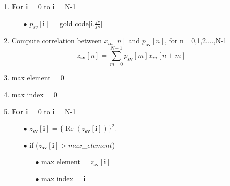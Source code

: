 \documentclass[journal,10pt,onecolumn]{article}
\begin{document}
\begin{enumerate}
\begin{enumerate}
        \item \textbf{For} \textbf{i} = 0 to \textbf{i} = N-1
        \begin{enumerate}
            \item[$\bullet$] $p_{sv}[\textbf{i}]$ = gold$\_$code[\textbf{i}.$\frac{fc}{fs}$]
        \end{enumerate}

        
        
        \item Compute correlation between $x_{in}[n]$ and $p_{\textbf{sv}}[n]$, for n= 0,1,2....,N-1
        \begin{equation}
            z{_{\textbf{sv}}}[n] = \sum_{m = 0}^{N-1}p_{\textbf{sv}}[m]x_{in}[n+m]
        \end{equation} 
        \item max$\_$element =   0
        \item max$\_$index   =   0
        \item \textbf{For} \textbf{i} = 0 to \textbf{i} = N-1
        \begin{enumerate}
            \item [$\bullet$]   $z{_{\textbf{sv}}}[\textbf{i}]$ = $\{{\operatorname{Re}(z{_{\textbf{sv}}}[\textbf{i}])}\}^2$.
        \end{enumerate}
        
        
        \begin{enumerate}
            \item[$\bullet$] if  ($z{_{\textbf{sv}}}[\textbf{i}] >  max$\_$element$) 
            \begin{enumerate}
                \item[$\bullet$] max$\_$element = $z{_{\textbf{sv}}}[\textbf{i}]$
                \item[$\bullet$] max$\_$index   =   \textbf{i}
            \end{enumerate}
        \end{enumerate}


\end{enumerate}
\end{enumerate}
\end{document}
